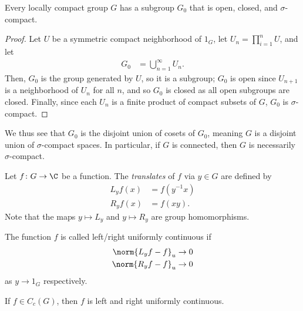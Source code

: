 \documentclass[10pt]{mypackage}
\begin{document}
\begin{proposition}
  Every locally compact  group $G$ has a subgroup $G_0$ that is open, closed, and $\sigma$-compact.
\end{proposition}
\begin{proof}
  Let $U$ be a symmetric compact neighborhood of $1_G$, let $U_n = \prod_{i=1}^{n}U$, and let
  \begin{align*}
    G_0 &= \bigcup_{n=1}^{\infty}U_n.
  \end{align*}
  Then, $G_0$ is the group generated by $U$, so it is a subgroup; $G_0$ is open since $U_{n+1}$ is a neighborhood of $U_n$ for all $n$, and so $G_0$ is closed as all open subgroups are closed. Finally, since each $U_n$ is a finite product of compact subsets of $G$, $G_0$ is $\sigma$-compact.
\end{proof}
We thus see that $G_0$ is the disjoint union of cosets of $G_0$, meaning $G$ is a disjoint union of $\sigma$-compact spaces. In particular, if $G$ is connected, then $G$ is necessarily $\sigma$-compact.
\begin{definition}
  Let $f\colon G\rightarrow \C$ be a function. The \textit{translates} of $f$ via $y\in G$ are defined by
  \begin{align*}
    L_yf(x) &= f\left( y^{-1}x \right)\\
    R_yf(x) &= f\left( xy \right).
  \end{align*}
  Note that the maps $y\mapsto L_y$ and $y\mapsto R_y$ are group homomorphisms.\newline

  The function $f$ is called left/right uniformly continuous if
  \begin{align*}
    \norm{L_yf-f}_{u} &\rightarrow 0\\
    \norm{R_yf - f}_{u} &\rightarrow 0
  \end{align*}
  as $y\rightarrow 1_{G}$ respectively.
\end{definition}
\begin{proposition}
  If $f\in C_c(G)$, then $f$ is left and right uniformly continuous.
\end{proposition}
\end{document}

